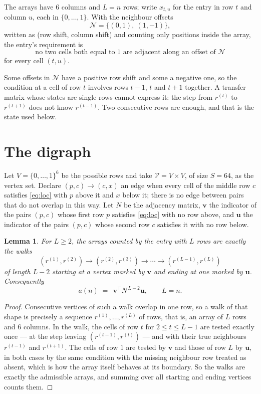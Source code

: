 \documentclass[11pt,a4paper]{article}
\theoremstyle{plain}
\newtheorem{lemma}[theorem]{Lemma}
\theoremstyle{definition}
\begin{document}
The arrays have $6$ columns and $L=n$ rows; write $x_{t,u}$ for the entry in
row $t$ and column $u$, each in $\{0,\dots,1\}$. With the neighbour offsets
\[
\mathcal N=\{(0,1),\ (1,-1)\},
\]
written as (row shift, column shift) and counting only positions inside the array, the
entry's requirement is
\begin{equation}\label{eq:loc}
\text{no two cells both equal to }1\text{ are adjacent along an offset of }\mathcal N
\end{equation}
for every cell $(t,u)$.

Some offsets in $\mathcal N$ have a positive row shift and some a negative one, so the
condition at a cell of row $t$ involves rows $t-1$, $t$ and $t+1$ together. A transfer
matrix whose states are single rows cannot express it: the step from $r^{(t)}$ to
$r^{(t+1)}$ does not know $r^{(t-1)}$. Two consecutive rows are enough, and that is
the state used below.

\section{The digraph}

Let $V=\{0,\dots,1\}^{6}$ be the possible rows and take
$\mathcal V=V\times V$, of size $S=64$, as the vertex set. Declare $(p,c)\to(c,x)$ an edge
when every cell of the middle row $c$ satisfies \eqref{eq:loc} with $p$ above it and $x$
below it; there is no edge between pairs that do not overlap in this way. Let $N$ be the
adjacency matrix, $\mathbf{v}$ the indicator of the pairs $(p,c)$ whose first row $p$
satisfies \eqref{eq:loc} with no row above, and $\mathbf{u}$ the indicator of
the pairs $(p,c)$ whose second row $c$ satisfies it with no row below.

\begin{lemma}\label{lem:walk}
For $L\ge2$, the arrays counted by the entry with $L$ rows are exactly the walks
\[
(r^{(1)},r^{(2)})\to(r^{(2)},r^{(3)})\to\cdots\to(r^{(L-1)},r^{(L)})
\]
of length $L-2$ starting at a vertex marked by $\mathbf{v}$ and ending at one marked by
$\mathbf{u}$. Consequently
\[
a(n)\;=\;\,\mathbf{v}^{\!\top}N^{\,L-2}\mathbf{u},\qquad L=n .
\]
\end{lemma}

\begin{proof}
Consecutive vertices of such a walk overlap in one row, so a walk of that shape is
precisely a sequence $r^{(1)},\dots,r^{(L)}$ of rows, that is, an array of $L$ rows
and $6$ columns. In the walk, the cells of row $t$ for $2\le t\le L-1$ are tested
exactly once --- at the step leaving $(r^{(t-1)},r^{(t)})$ --- and with their true
neighbours $r^{(t-1)}$ and $r^{(t+1)}$. The cells of row $1$ are tested by
$\mathbf{v}$ and those of row $L$ by $\mathbf{u}$, in both cases by the same condition
with the missing neighbour row treated as absent, which is how the array itself behaves at
its boundary. So the walks are exactly the admissible arrays, and summing over all starting
and ending vertices counts them.
\end{proof}
\end{document}
